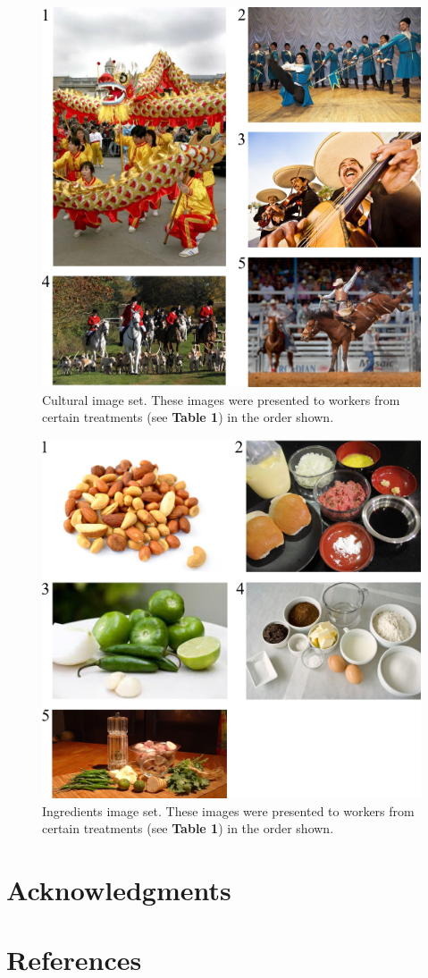 \documentclass[a4paper]{report}
\begin{document}
\begin{figure}
	\includegraphics[scale=1.00]{figs/taskImages/cultural.jpg}
	\caption{Cultural image set. These images were presented to workers from 
		certain treatments (see \textbf{Table 1}) in the order shown.}
\end{figure}

\begin{figure}
	\includegraphics[scale=1.00]{figs/taskImages/ingredients.jpg}
	\caption{ Ingredients image set. These images were presented to workers 
		from certain treatments (see \textbf{Table 1}) in the order shown.}
\end{figure}
\section*{Acknowledgments}
\section*{References}
\begingroup
\renewcommand{\chapter}[2]{}

\endgroup
 
\end{document}

